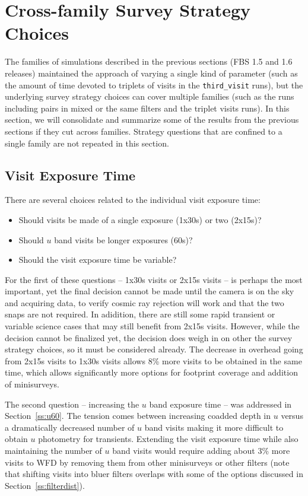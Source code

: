\section{Cross-family Survey Strategy Choices}

The families of simulations described in the previous sections (FBS 1.5 and 1.6 releases) maintained the approach of varying a single kind of parameter (such as the amount of time devoted to triplets of visits in the {\tt third\_visit} runs), but the underlying survey strategy choices can cover multiple families (such as the runs including pairs in mixed or the same filters and the triplet visits runs). In this section, we will consolidate and summarize some of the results from the previous sections if they cut across families. Strategy questions that are confined to a single family are not repeated in this section.

\subsection{Visit Exposure Time}\label{sec:visitexposuretime}

There are several choices related to the individual visit exposure time:
 \begin{itemize}
 \item Should visits be made of a single exposure (1x30s) or two (2x15s)? 
 \item Should $u$ band visits be longer exposures (60s)?
 \item Should the visit exposure time be variable?
 \end{itemize}
 
For the first of these questions -- 1x30s visits or 2x15s visits -- is perhaps the most important, yet the final decision cannot be made until the camera is on the sky and acquiring data, to verify cosmic ray rejection will work and that the two snaps are not required. In adidition, there are still some rapid transient or variable science cases that may still benefit from 2x15s visits. However, while the decision cannot be finalized yet, the decision does weigh in on other the survey strategy choices, so it must be considered already. The decrease in overhead going from 2x15s visits to 1x30s visits allows 8\% more visits to be obtained in the same time, which allows significantly more options for footprint coverage and addition of minisurveys. 

The second question -- increasing the $u$ band exposure time -- was addressed in Section~\ref{ss:u60}. The tension comes between increasing coadded depth in $u$ versus a dramatically decreased number of $u$ band visits making it more difficult to obtain $u$ photometry for transients. Extending the visit exposure time while also maintaining the number of $u$ band visits would require adding about 3\% more visits to WFD by removing them from other minisurveys or other filters (note that shifting visits into bluer filters overlaps with some of the options discussed in Section~\ref{ss:filterdist}). 

